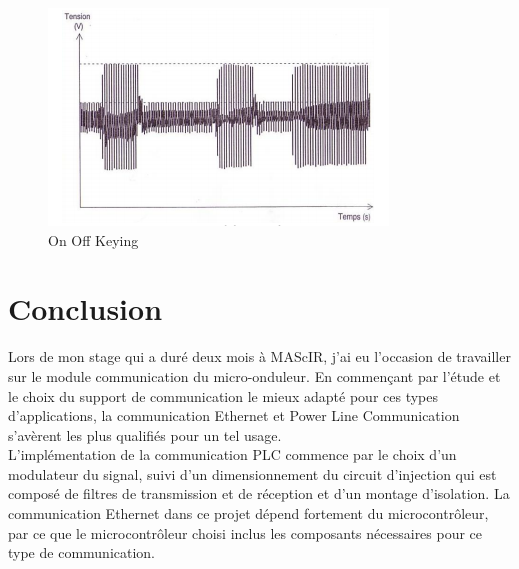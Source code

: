 \documentclass[11pt, a4paper, twoside]{book}
\begin{document}
\begin{figure}[h!]
\centering
\includegraphics[width=\textwidth]{ook}
\caption{On Off Keying}
\end{figure}
























\chapter*{Conclusion}
Lors de mon stage qui a duré deux mois à MAScIR, j'ai eu l'occasion de travailler sur le module communication du micro-onduleur. En commençant par l'étude et le choix du support de communication le mieux adapté pour ces types d'applications, la communication Ethernet et Power Line Communication s'avèrent les plus qualifiés pour un tel usage.\\

L'implémentation de la communication PLC commence par le choix d'un modulateur du signal, suivi d'un dimensionnement du circuit d'injection qui est composé de filtres de transmission et de réception et d'un montage d'isolation.
La communication Ethernet dans ce projet dépend fortement du microcontrôleur, par ce que le microcontrôleur choisi inclus les composants nécessaires pour ce type de communication.\\
\end{document}
